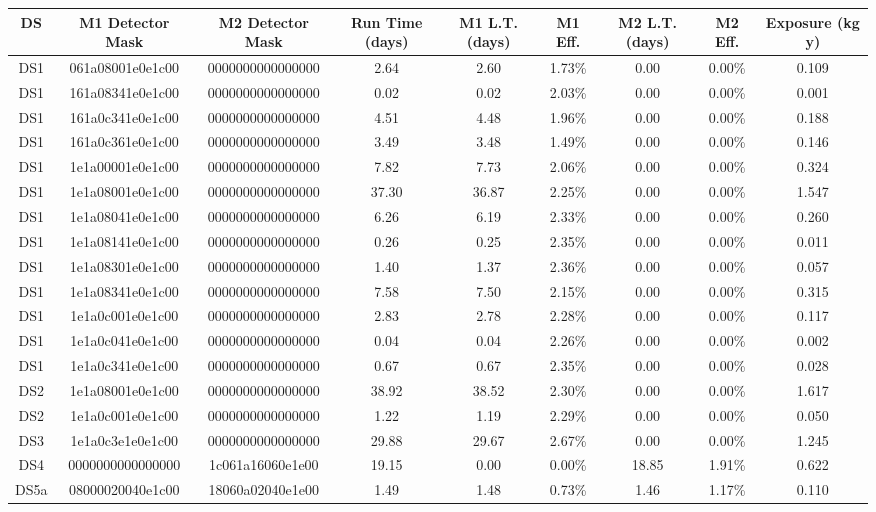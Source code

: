 \begin{tabular}{|c|c c|c|c c|c c|c|}
\hline
  DS & M1 Detector Mask & M2 Detector Mask & Run Time (days) & M1 L.T. (days) & M1 Eff. & M2 L.T. (days) & M2 Eff. & Exposure (kg y) \\
\hline
  DS1 & 061a08001e0e1c00 & 0000000000000000 & 2.64 & 2.60 & 1.73\% & 0.00 & 0.00\% & 0.109 \\
  DS1 & 161a08341e0e1c00 & 0000000000000000 & 0.02 & 0.02 & 2.03\% & 0.00 & 0.00\% & 0.001 \\
  DS1 & 161a0c341e0e1c00 & 0000000000000000 & 4.51 & 4.48 & 1.96\% & 0.00 & 0.00\% & 0.188 \\
  DS1 & 161a0c361e0e1c00 & 0000000000000000 & 3.49 & 3.48 & 1.49\% & 0.00 & 0.00\% & 0.146 \\
  DS1 & 1e1a00001e0e1c00 & 0000000000000000 & 7.82 & 7.73 & 2.06\% & 0.00 & 0.00\% & 0.324 \\
  DS1 & 1e1a08001e0e1c00 & 0000000000000000 & 37.30 & 36.87 & 2.25\% & 0.00 & 0.00\% & 1.547 \\
  DS1 & 1e1a08041e0e1c00 & 0000000000000000 & 6.26 & 6.19 & 2.33\% & 0.00 & 0.00\% & 0.260 \\
  DS1 & 1e1a08141e0e1c00 & 0000000000000000 & 0.26 & 0.25 & 2.35\% & 0.00 & 0.00\% & 0.011 \\
  DS1 & 1e1a08301e0e1c00 & 0000000000000000 & 1.40 & 1.37 & 2.36\% & 0.00 & 0.00\% & 0.057 \\
  DS1 & 1e1a08341e0e1c00 & 0000000000000000 & 7.58 & 7.50 & 2.15\% & 0.00 & 0.00\% & 0.315 \\
  DS1 & 1e1a0c001e0e1c00 & 0000000000000000 & 2.83 & 2.78 & 2.28\% & 0.00 & 0.00\% & 0.117 \\
  DS1 & 1e1a0c041e0e1c00 & 0000000000000000 & 0.04 & 0.04 & 2.26\% & 0.00 & 0.00\% & 0.002 \\
  DS1 & 1e1a0c341e0e1c00 & 0000000000000000 & 0.67 & 0.67 & 2.35\% & 0.00 & 0.00\% & 0.028 \\
  DS2 & 1e1a08001e0e1c00 & 0000000000000000 & 38.92 & 38.52 & 2.30\% & 0.00 & 0.00\% & 1.617 \\
  DS2 & 1e1a0c001e0e1c00 & 0000000000000000 & 1.22 & 1.19 & 2.29\% & 0.00 & 0.00\% & 0.050 \\
  DS3 & 1e1a0c3e1e0e1c00 & 0000000000000000 & 29.88 & 29.67 & 2.67\% & 0.00 & 0.00\% & 1.245 \\
  DS4 & 0000000000000000 & 1c061a16060e1e00 & 19.15 & 0.00 & 0.00\% & 18.85 & 1.91\% & 0.622 \\
  DS5a & 08000020040e1c00 & 18060a02040e1e00 & 1.49 & 1.48 & 0.73\% & 1.46 & 1.17\% & 0.110 \\

\end{tabular}
